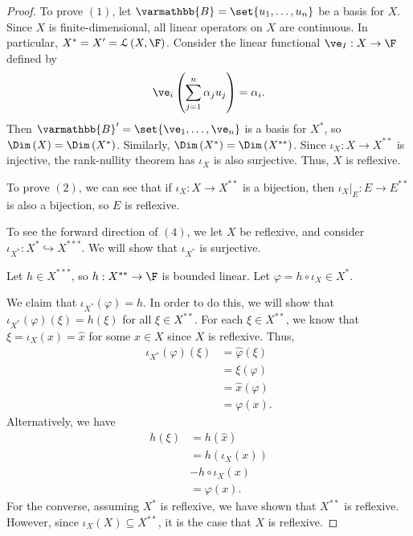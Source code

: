 \documentclass[10pt]{mypackage}
\renewcommand*{\mathbb}[1]{\varmathbb{#1}}
\newcommand{\B}{\mathbb{B}}
\begin{document}
\begin{proof}
  To prove $(1)$, let $\B = \set{u_1,\dots,u_n}$ be a basis for $X$. Since $X$ is finite-dimensional, all linear operators on $X$ are continuous. In particular, $X^{\ast} = X' = \mathcal{L}\left(X,\F\right)$. Consider the linear functional $\ve_I: X\rightarrow \F$ defined by
  \begin{align*}
    \ve_i\left(\sum_{j=1}^{n}\alpha_ju_j\right) = \alpha_i.
  \end{align*}
  Then $\B' = \set{\ve_1,\dots,\ve_n}$ is a basis for $X^{\ast}$, so $\Dim\left(X\right) = \Dim\left(X^{\ast}\right)$. Similarly, $\Dim\left(X^{\ast}\right) = \Dim\left(X^{\ast\ast}\right)$. Since $\iota_X: X\rightarrow X^{\ast\ast}$ is injective, the rank-nullity theorem has $\iota_X$ is also surjective. Thus, $X$ is reflexive.\newline
  
  To prove $(2)$, we can see that if $\iota_X: X\rightarrow X^{\ast\ast}$ is a bijection, then $\iota_{X}|_{E}: E\rightarrow E^{\ast\ast}$ is also a bijection, so $E$ is reflexive.\newline

  To see the forward direction of $(4)$, we let $X$ be reflexive, and consider $\iota_{X^{\ast}}: X^{\ast}\hookrightarrow X^{\ast\ast\ast}$. We will show that $\iota_{X^{\ast}}$ is surjective.\newline

  Let $h\in X^{\ast\ast\ast}$, so $h: X^{\ast\ast}\rightarrow \F$ is bounded linear. Let $\varphi = h\circ \iota_X\in X^{\ast}$.\newline

  We claim that $\iota_{X^{\ast}}\left(\varphi\right) = h$. In order to do this, we will show that $\iota_{X^{\ast}}\left(\varphi\right)\left(\xi\right) = h\left(\xi\right)$ for all $\xi\in X^{\ast\ast}$. For each $\xi\in X^{\ast\ast}$, we know that $\xi = \iota_{X}\left(x\right) = \hat{x}$ for some $x\in X$ since $X$ is reflexive. Thus,
  \begin{align*}
    \iota_{X^{\ast}}\left(\varphi\right)\left(\xi\right) &= \hat{\varphi}\left(\xi\right)\\
                                                         &= \xi\left(\varphi\right)\\
                                                         &= \hat{x}\left(\varphi\right)\\
                                                         &= \varphi(x).
  \end{align*}
  Alternatively, we have
  \begin{align*}
    h\left(\xi\right) &= h\left(\hat{x}\right)\\
                      &= h\left(\iota_X\left(x\right)\right)\\
                      &- h\circ \iota_X\left(x\right)\\
                      &= \varphi(x).
  \end{align*}
  For the converse, assuming $X^{\ast}$ is reflexive, we have shown that $X^{\ast\ast}$ is reflexive. However, since $\iota_X\left(X\right) \subseteq X^{\ast\ast}$, it is the case that $X$ is reflexive.
\end{proof}
\end{document}
